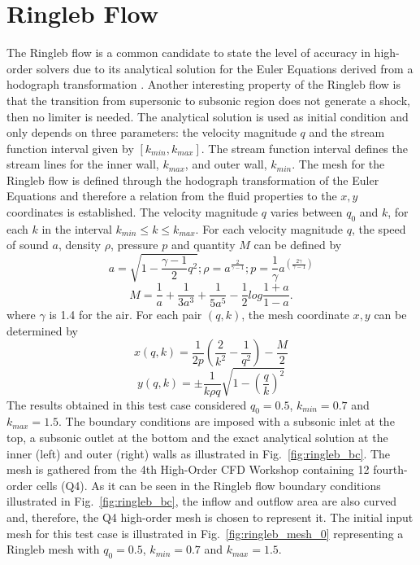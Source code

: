 \section{Ringleb Flow}
%
The Ringleb flow is a common candidate to state the level of accuracy in high-order solvers due to its analytical solution for the Euler Equations derived from a hodograph transformation \cite{Shapiro1953}. Another interesting property of the Ringleb flow is that the transition from supersonic to subsonic region does not generate a shock, then no limiter is needed. The analytical solution is used as initial condition and only depends on three parameters: the velocity magnitude $q$ and the stream function interval given by $[k_{min}, k_{max}]$. The stream function interval defines the stream lines for the inner wall, $k_{max}$, and outer wall, $k_{min}$. The mesh for the Ringleb flow is defined through the hodograph transformation of the Euler Equations and therefore a relation from the fluid properties to the $x, y$ coordinates is established. The velocity magnitude $q$ varies between $q_0$ and $k$, for each $k$ in the interval $k_{min} \leq k \leq k_{max}$. For each velocity magnitude $q$, the speed of sound $a$, density $\rho$, pressure $p$ and quantity $M$ can be defined by
%
\begin{equation}
    \label{eq_ringleb_analytical_1}
	a = \sqrt{1 - \frac{\gamma -1}{2}q^2}; \rho = a^{\frac{2}{\gamma -1}}; p = \frac{1}{\gamma}a^{\left(\frac{2\gamma}{\gamma - 1}\right)}
\end{equation}
% 
\begin{equation}
    \label{eq_ringleb_analytical_2}
	 M = \frac{1}{a} + \frac{1}{3a^3} + \frac{1}{5a^5} - \frac{1}{2} log\frac{1+a}{1-a}.
\end{equation}
%
where $\gamma$ is 1.4 for the air. 
For each pair $(q, k)$, the mesh coordinate $x, y$ can be determined by
%
\begin{equation}
    \label{eq_ringleb_mesh_x}
	x(q, k) = \frac{1}{2p}\left(\frac{2}{k^2}-\frac{1}{q^2}\right)-\frac{M}{2}
\end{equation}
%
\begin{equation}
    \label{eq_ringleb_mesh_y}
	y(q, k) = \pm \frac{1}{k\rho q} \sqrt{1 - \left(\frac{q}{k}\right)^2}
\end{equation}
%
The results obtained in this test case considered $q_0=0.5$, $k_{min}=0.7$ and $k_{max}=1.5$. The boundary conditions are imposed with a subsonic inlet at the top, a subsonic outlet at the bottom and the exact analytical solution at the inner (left) and outer (right) walls as illustrated in Fig.\ \ref{fig:ringleb_bc}. The mesh is gathered from the 4th High-Order CFD Workshop \cite{4thHOW} containing 12 fourth-order cells (Q4). As it can be seen in the Ringleb flow boundary conditions illustrated in Fig.\ \ref{fig:ringleb_bc}, the inflow and outflow area are also curved and, therefore, the Q4 high-order mesh is chosen to represent it. The initial input mesh for this test case is illustrated in Fig.\ \ref{fig:ringleb_mesh_0} representing a Ringleb mesh with $q_0=0.5$, $k_{min}=0.7$ and $k_{max}=1.5$.
